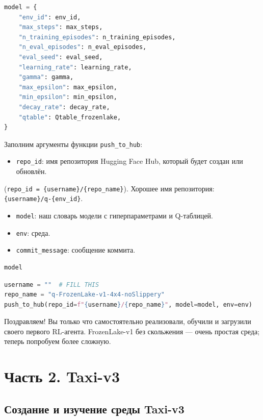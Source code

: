 \documentclass[11pt,a4paper]{article}
\begin{document}
\begin{lstlisting}[language=Python]
model = {
    "env_id": env_id,
    "max_steps": max_steps,
    "n_training_episodes": n_training_episodes,
    "n_eval_episodes": n_eval_episodes,
    "eval_seed": eval_seed,
    "learning_rate": learning_rate,
    "gamma": gamma,
    "max_epsilon": max_epsilon,
    "min_epsilon": min_epsilon,
    "decay_rate": decay_rate,
    "qtable": Qtable_frozenlake,
}
\end{lstlisting}

Заполним аргументы функции \passthrough{\lstinline!push_to_hub!}:

\begin{itemize}
\tightlist
\item
  \passthrough{\lstinline!repo_id!}: имя репозитория Hugging Face Hub, который будет создан или обновлён.
\end{itemize}

(\texttt{repo\_id = \{username\}/\{repo\_name\}}). Хорошее имя репозитория: \texttt{\{username\}/q-\{env\_id\}}.

\begin{itemize}
\tightlist
\item
  \passthrough{\lstinline!model!}: наш словарь модели с гиперпараметрами и Q-таблицей.
\item
  \passthrough{\lstinline!env!}: среда.
\item
  \passthrough{\lstinline!commit_message!}: сообщение коммита.
\end{itemize}

\begin{lstlisting}[language=Python]
model
\end{lstlisting}

\begin{lstlisting}[language=Python]
username = ""  # FILL THIS
repo_name = "q-FrozenLake-v1-4x4-noSlippery"
push_to_hub(repo_id=f"{username}/{repo_name}", model=model, env=env)
\end{lstlisting}

Поздравляем! Вы только что самостоятельно реализовали, обучили и загрузили своего первого RL-агента. FrozenLake-v1 без скольжения --- очень простая среда; теперь попробуем более сложную.

\section{Часть 2. Taxi-v3}\label{part-2-taxi-v3}

\subsection{Создание и изучение среды Taxi-v3}\label{create-and-understand-taxi-v3}
\end{document}
